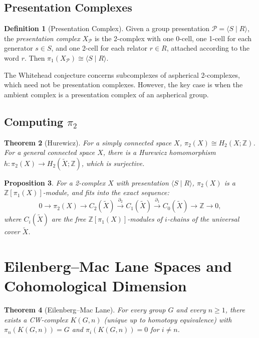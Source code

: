 \documentclass[12pt,a4paper]{amsart}
\newtheorem{theorem}{Theorem}[section]
\newtheorem{proposition}[theorem]{Proposition}
\theoremstyle{definition}
\newtheorem{definition}[theorem]{Definition}
\theoremstyle{remark}
\newcommand{\Z}{\mathbb{Z}}
\begin{document}
\subsection{Presentation Complexes}

\begin{definition}[Presentation Complex]
Given a group presentation $\mathcal{P} = \langle S \mid R \rangle$,
the \emph{presentation complex} $X_{\mathcal{P}}$ is the 2-complex
with one 0-cell, one 1-cell for each generator $s \in S$, and one
2-cell for each relator $r \in R$, attached according to the word $r$.
Then $\pi_1(X_{\mathcal{P}}) \cong \langle S \mid R \rangle$.
\end{definition}

The Whitehead conjecture concerns subcomplexes of aspherical 2-complexes,
which need not be presentation complexes. However, the key case is when
the ambient complex is a presentation complex of an aspherical group.

\subsection{Computing $\pi_2$}

\begin{theorem}[Hurewicz]
For a simply connected space $X$, $\pi_2(X) \cong H_2(X; \Z)$.
For a general connected space $X$, there is a Hurewicz homomorphism
$h \colon \pi_2(X) \to H_2(\widetilde{X}; \Z)$, which is surjective.
\end{theorem}

\begin{proposition}
For a 2-complex $X$ with presentation $\langle S \mid R \rangle$,
$\pi_2(X)$ is a $\Z[\pi_1(X)]$-module, and fits into the exact sequence:
\[
    0 \to \pi_2(X) \to C_2(\widetilde{X}) \xrightarrow{\partial_2}
    C_1(\widetilde{X}) \xrightarrow{\partial_1}
    C_0(\widetilde{X}) \to \Z \to 0,
\]
where $C_i(\widetilde{X})$ are the free $\Z[\pi_1(X)]$-modules of
$i$-chains of the universal cover $\widetilde{X}$.
\end{proposition}

\section{Eilenberg--Mac Lane Spaces and Cohomological Dimension}

\begin{theorem}[Eilenberg--Mac Lane]
For every group $G$ and every $n \geq 1$, there exists a CW-complex $K(G,n)$
(unique up to homotopy equivalence) with $\pi_n(K(G,n)) = G$ and
$\pi_i(K(G,n)) = 0$ for $i \neq n$.
\end{theorem}
\end{document}
